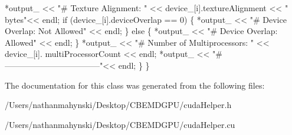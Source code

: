 \begin{DoxyCode}
        *output\_ << \textcolor{stringliteral}{"# Texture Alignment: "} << device\_[i].textureAlignment << \textcolor{stringliteral}{"
       bytes"}<< endl;
        \textcolor{keywordflow}{if} (device\_[i].deviceOverlap == 0) \{
            *output\_ << \textcolor{stringliteral}{"# Device Overlap: Not Allowed"} << endl;
        \} \textcolor{keywordflow}{else} \{
            *output\_ << \textcolor{stringliteral}{"# Device Overlap: Allowed"} << endl;
        \}
        *output\_ << \textcolor{stringliteral}{"# Number of Multiprocessors: "} << device\_[i].
      multiProcessorCount << endl;
        *output\_ << \textcolor{stringliteral}{"# -----------------------------------"}<< endl;
    \}
\}
\end{DoxyCode}


The documentation for this class was generated from the following files\-:\begin{DoxyCompactItemize}
\item 
/\-Users/nathanmahynski/\-Desktop/\-C\-B\-E\-M\-D\-G\-P\-U/cuda\-Helper.\-h\item 
/\-Users/nathanmahynski/\-Desktop/\-C\-B\-E\-M\-D\-G\-P\-U/cuda\-Helper.\-cu\end{DoxyCompactItemize}

